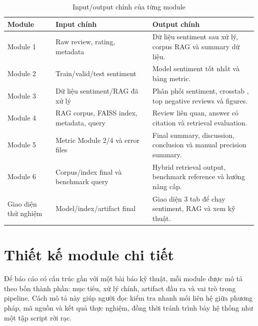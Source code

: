 \begin{table}[H]
\centering
\caption{Input/output chính của từng module}
\label{tab:module-io-contract}
\small
\begin{tabularx}{\textwidth}{L{0.18\textwidth}Y Y}
\toprule
Module & Input chính & Output chính \\
\midrule
Module 1 & Raw review, rating, metadata & Dữ liệu sentiment sau xử lý, corpus RAG và summary dữ liệu. \\
Module 2 & Train/valid/test sentiment & Model sentiment tốt nhất và bảng metric. \\
Module 3 & Dữ liệu sentiment/RAG đã xử lý & Phân phối sentiment, crosstab \RatingSentiment{}, top negative reviews và figures. \\
Module 4 & RAG corpus, FAISS index, metadata, query & Review liên quan, answer có citation và retrieval evaluation. \\
Module 5 & Metric Module 2/4 và error files & Final summary, discussion, conclusion và manual precision summary. \\
Module 6 & Corpus/index final và benchmark query & Hybrid retrieval output, benchmark reference và hướng nâng cấp. \\
Giao diện thử nghiệm & Model/index/artifact final & Giao diện 3 tab để chạy sentiment, RAG và xem kỹ thuật. \\
\bottomrule
\end{tabularx}
\end{table}

\clearpage
\section{Thiết kế module chi tiết}
Để báo cáo có cấu trúc gần với một bài báo kỹ thuật, mỗi module được mô tả theo bốn thành phần: mục tiêu, xử lý chính, artifact đầu ra và vai trò trong pipeline. Cách mô tả này giúp người đọc kiểm tra nhanh mối liên hệ giữa phương pháp, mã nguồn và kết quả thực nghiệm, đồng thời tránh trình bày hệ thống như một tập script rời rạc.

